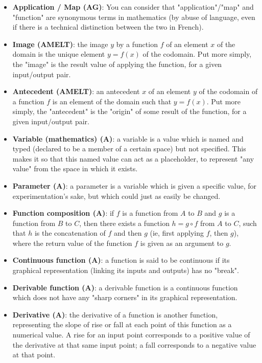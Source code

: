 \documentclass{article}
\begin{document}
\begin{itemize}
	\item \textbf{Application / Map (AG)}: You can consider that "application"/"map" and "function" are synonymous terms in mathematics (by abuse of language, even if there is a technical distinction between the two in French).

	\item \textbf{Image (AMELT)}: the image $y$ by a function $f$ of an element $x$ of the domain is the unique element $y = f(x)$ of the codomain. Put more simply, the "image" is the result value of applying the function, for a given input/output pair.

	\item \textbf{Antecedent (AMELT)}: an antecedent $x$ of an element $y$ of the codomain of a function $f$ is an element of the domain such that $y = f(x)$. Put more simply, the "antecedent" is the "origin" of some result of the function, for a given input/output pair.

	\item \textbf{Variable (mathematics) (A)}: a variable is a value which is named and typed (declared to be a member of a certain space) but not specified. This makes it so that this named value can act as a placeholder, to represent "any value" from the space in which it exists.

	\item \textbf{Parameter (A)}: a parameter is a variable which is given a specific value, for experimentation's sake, but which could just as easily be changed.

	\item \textbf{Function composition (A)}: if $f$ is a function from $A$ to $B$ and $g$ is a function from $B$ to $C$, then there exists a function $h = g \circ f$ from $A$ to $C$, such that $h$ is the concatenation of $f$ and then $g$ (ie, first applying $f$, then $g$), where the return value of the function $f$ is given as an argument to $g$.

	\item \textbf{Continuous function (A)}: a function is said to be continuous if its graphical representation (linking its inputs and outputs) has no "break".

	\item \textbf{Derivable function (A)}: a derivable function is a continuous function which does not have any "sharp corners" in its graphical representation.

	\item \textbf{Derivative (A)}: the derivative of a function is another function, representing the slope of rise or fall at each point of this function as a numerical value. A rise for an input point corresponds to a positive value of the derivative at that same input point; a fall corresponds to a negative value at that point.


\end{itemize}
\end{document}
